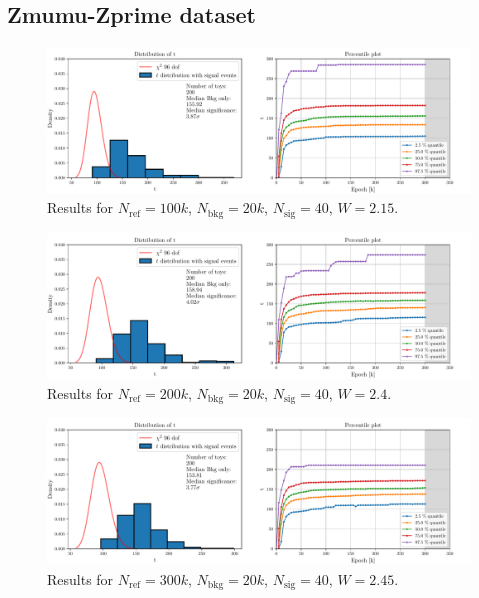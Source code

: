 \subsection*{Zmumu-Zprime dataset}

\begin{figure}[H]
	\centering
	\includegraphics[width=1.0\textwidth]{Python/RESULTS/ref100000_bkg20000_sig40/data_ref100000_bkg20000_sig40_wclip2-15.pdf}
	\caption{Results for $N_\mathrm{ref}=100\si{k}$, $N_\mathrm{bkg}=20\si{k}$, $N_\mathrm{sig}=40$, $W=2.15$.}
	\label{fig:REF100000_BKG20000_SIG40_WCLIP2.15}
\end{figure}
\vspace{-5mm}
\begin{figure}[H]
	\centering
	\includegraphics[width=1.0\textwidth]{Python/RESULTS/ref200000_bkg20000_sig40/data_ref200000_bkg20000_sig40_wclip2-4.pdf}
	\caption{Results for $N_\mathrm{ref}=200\si{k}$, $N_\mathrm{bkg}=20\si{k}$, $N_\mathrm{sig}=40$, $W=2.4$.}
	\label{fig:REF200000_BKG20000_SIG40_WCLIP2.4}
\end{figure}
\vspace{-5mm}
\begin{figure}[H]
	\centering
	\includegraphics[width=1.0\textwidth]{Python/RESULTS/ref300000_bkg20000_sig40/data_ref300000_bkg20000_sig40_wclip2-45.pdf}
	\caption{Results for $N_\mathrm{ref}=300\si{k}$, $N_\mathrm{bkg}=20\si{k}$, $N_\mathrm{sig}=40$, $W=2.45$.}
	\label{fig:REF300000_BKG20000_SIG40_WCLIP2.45}
\end{figure}
